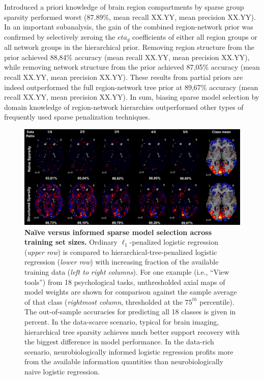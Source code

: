 \documentclass{article} %
\begin{document}
Introduced a priori knowledge of brain region compartments
by sparse group sparsity performed worst
(87.89\%, mean recall XX.YY, mean precision XX.YY).
%
In an important subanalysis,
the gain of the combined region-network prior was confirmed by
selectively zeroing the $eta_g$ coefficients of either all region groups
or all network groups in the hierarchical prior.
Removing region structure from the prior achieved
88,84\% accuracy (mean recall XX.YY, mean precision XX.YY),
while removing network structure from the prior achieved
87,05\% accuracy (mean recall XX.YY, mean precision XX.YY).
These results from partial priors are indeed outperformed
the full region-network tree prior at 89,67\% accuracy
(mean recall XX.YY, mean precision XX.YY).
%
In sum,
biasing sparse model selection by domain knowledge of region-network hierarchies
outperformed other types of frequently used sparse penalization techniques.



\begin{figure}
\begin{centering}
\includegraphics[width=1.00\textwidth]{figures/dataratio.pdf}
\end{centering}
\vspace{-0.6cm}
\caption{\textbf{Na\"ive versus informed sparse model selection
across training set sizes.}
Ordinary $\ell_1$-penalized logistic regression
(\textit{upper row})
is compared
to hierarchical-tree-penalized logistic regression
(\textit{lower row})
with increasing fraction
of the available training data (\textit{left to right columns}).
For one example (i.e., ``View tools'') from 18 psychological tasks,
unthresholded axial maps of model weights
are shown for comparison against
the sample average of that class
(\textit{rightmost column}, thresholded at the $75^{th}$ percentile).
The out-of-sample accuracies for predicting all 18 classes
is given in percent.
%
In the data-scarce scenario,
typical for brain imaging,
hierarchical tree sparsity achieves much
better support recovery with the biggest difference
in model performance.
%
In the data-rich scenario,
neurobiologically informed logistic regression
profits more from the available information quantities than
neurobiologically naive logistic regression.
}
\label{fig_dataratio}
\end{figure}
\end{document}

